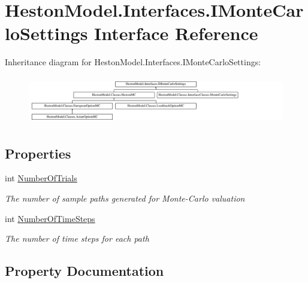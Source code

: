 \hypertarget{interface_heston_model_1_1_interfaces_1_1_i_monte_carlo_settings}{}\section{Heston\+Model.\+Interfaces.\+I\+Monte\+Carlo\+Settings Interface Reference}
\label{interface_heston_model_1_1_interfaces_1_1_i_monte_carlo_settings}
Inheritance diagram for Heston\+Model.\+Interfaces.\+I\+Monte\+Carlo\+Settings\+:\begin{figure}[H]
\begin{center}
\leavevmode
\includegraphics[height=2.109228cm]{interface_heston_model_1_1_interfaces_1_1_i_monte_carlo_settings}
\end{center}
\end{figure}
\subsection*{Properties}
\begin{DoxyCompactItemize}
\item 
int \mbox{\hyperlink{interface_heston_model_1_1_interfaces_1_1_i_monte_carlo_settings_a6ba7b3898087faa80b0ab6ef1ec974d3}{Number\+Of\+Trials}}
\begin{DoxyCompactList}\small\item\em The number of sample paths generated for Monte-\/\+Carlo valuation \end{DoxyCompactList}\item 
int \mbox{\hyperlink{interface_heston_model_1_1_interfaces_1_1_i_monte_carlo_settings_a15a9c7a27de46922fd3d79ae636c227c}{Number\+Of\+Time\+Steps}}
\begin{DoxyCompactList}\small\item\em The number of time steps for each path \end{DoxyCompactList}\end{DoxyCompactItemize}


\subsection{Property Documentation}
\mbox{\label{interface_heston_model_1_1_interfaces_1_1_i_monte_carlo_settings_a15a9c7a27de46922fd3d79ae636c227c}} 
